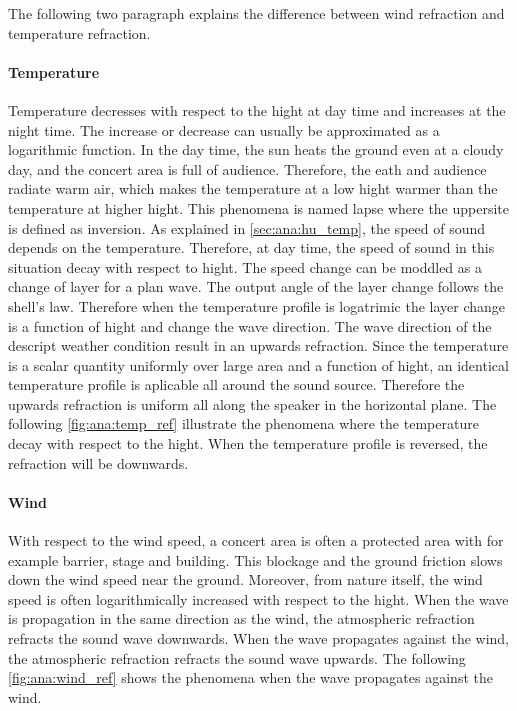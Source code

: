 The following two paragraph explains the difference between wind refraction and temperature refraction.

\paragraph{Temperature} Temperature decresses with respect to the hight at day time and increases at the night time. The increase or decrease can usually be approximated as a logarithmic function. In the day time, the sun heats the ground even at a cloudy day, and the concert area is full of audience. Therefore, the eath and audience radiate warm air, which makes the temperature at a low hight warmer than the temperature at higher hight. This phenomena is named lapse where the uppersite is defined as inversion. As explained in \autoref{sec:ana:hu_temp}, the speed of sound depends on the temperature. Therefore, at day time, the speed of sound in this situation decay with respect to hight. The speed change can be moddled as a change of layer for a plan wave. The output angle of the layer change follows the shell's law. Therefore when the temperature profile is logatrimic the layer change is a function of hight and change the wave direction. The wave direction of the descript weather condition result in an upwards refraction. Since the temperature is a scalar quantity uniformly over large area and a function of hight, an identical temperature profile is aplicable all around the sound source. Therefore the upwards refraction is uniform all along the speaker in the horizontal plane. The following \autoref{fig:ana:temp_ref} illustrate the phenomena where the temperature decay with respect to the hight.
When the temperature profile is reversed, the refraction will be downwards. 


\paragraph{Wind} With respect to the wind speed, a concert area is often a protected area with for example barrier, stage and building. This blockage and the ground friction slows down the wind speed near the ground. Moreover, from nature itself, the wind speed is often logarithmically increased with respect to the hight. When the wave is propagation in the same direction as the wind, the atmospheric refraction refracts the sound wave downwards. When the wave propagates against the wind, the atmospheric refraction refracts the sound wave upwards. The following \autoref{fig:ana:wind_ref} shows the phenomena when the wave propagates against the wind.

